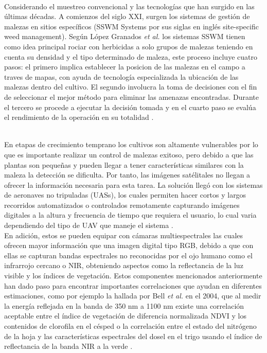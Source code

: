 \documentclass[journal,article,submit,moreauthors,pdftex]{Definitions/mdpi}
\begin{document}
\\
Considerando el muestreo convencional y las tecnologías que han surgido en las últimas décadas. A comienzos del siglo XXI, surgen los sistemas de gestión de malezas en sitios específicos (SSWM Systems por sus siglas en inglés site-specific weed management)\cite{c50}. Según López Granados \textit{et al.} \cite{c7} los sistemas SSWM tienen como idea principal rociar con herbicidas a solo grupos de malezas teniendo en cuenta su densidad y el tipo determinado de maleza, este proceso incluye cuatro pasos: el primero implica establecer la posicion de las malezas en el campo a traves de mapas, con ayuda de tecnología especializada la ubicación de las malezas dentro del cultivo. El segundo involucra la toma de decisiones con el fin de seleccionar el mejor método para eliminar las amenazas encontradas. Durante el tercero se procede a ejecutar la decisión tomada y en el cuarto paso se evalúa el rendimiento de la operación en su totalidad \cite{c2}. 

\\
En etapas de crecimiento temprano los cultivos son altamente vulnerables por lo que es importante realizar un control de malezas exitoso, pero debido a que las plantas son pequeñas y pueden llegar a tener características similares con la maleza la detección se dificulta. Por tanto, las imágenes satélitales no llegan a ofrecer la información necesaria para esta tarea. La solución llegó con los sistemas de aeronaves no tripuladas (UASs), los cuales permiten hacer cortos y largos recorridos automatizados o controlados remotamente capturando imágenes digitales a la altura y frecuencia de tiempo que requiera el usuario, lo cual varia dependiendo del tipo de UAV que maneje el sistema \cite{c19,c48}.
\\
En adición, estos se pueden equipar con cámaras multiespectrales las cuales ofrecen mayor información que una imagen digital tipo RGB, debido a que con ellas se capturan bandas espectrales no reconocidas por el ojo humano como el infrarrojo cercano o NIR, obteniendo aspectos como la reflectancia de la luz visible y los índices de vegetación. Estos componentes mencionados anteriormente han dado paso para encontrar importantes correlaciones que ayudan en diferentes estimaciones, como por ejemplo la hallada por Bell  \textit{et al.} en el 2004, que al medir la energía reflejada en la banda de 350 nm a 1100 nm existe una correlación aceptable entre el índice de vegetación de diferencia normalizada NDVI y los contenidos de clorofila  en el césped \cite{c45} o la correlación entre el estado del nitrógeno de la hoja y las características espectrales del dosel en el trigo usando el índice de reflectancia de la banda NIR a la verde \cite{c44}. 
\\
\end{document}
